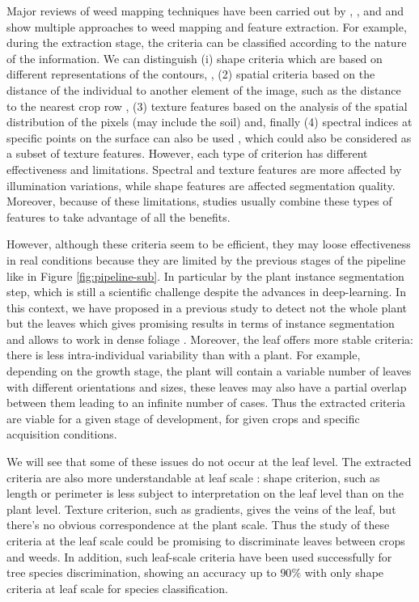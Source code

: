 \documentclass[../thesis.tex]{subfiles}
\begin{document}
	Major reviews of weed mapping techniques have been carried out by \cite{Monteiro2019}, \cite{GAO201843}, \cite{mostajer2019plant} and \cite{WANG2019226} and show multiple approaches to weed mapping and feature extraction. For example, during the extraction stage, the criteria can be classified according to the nature of the information. We can distinguish (i) shape criteria which are based on different representations of the contours, \cite{AHMED201298, PEREZ2000197}, (2) spatial criteria based on the distance of the individual to another element of the image, such as the distance to the nearest crop row \cite{rs10050761}, (3) texture features based on the analysis of the spatial distribution of the pixels (may include the soil) \cite{Rojas2017} and, finally (4) spectral indices at specific points on the surface can also be used \cite{Liu2019}, which could also be considered as a subset of texture features. However, each type of criterion has different effectiveness and limitations. Spectral and texture features are more affected by illumination variations, while shape features are affected segmentation quality. Moreover, because of these limitations, studies usually combine these types of features to take advantage of all the benefits.
    
    
    However, although these criteria seem to be efficient, they may loose effectiveness in real conditions because they are limited by the previous stages of the pipeline like in Figure \ref{fig:pipeline-sub}. In particular by the plant instance segmentation step, which is still a scientific challenge despite the advances in deep-learning. In this context, we have proposed in a previous study to detect not the whole plant but the leaves which gives promising results in terms of instance segmentation and allows to work in dense foliage \cite{vayssade2022}. Moreover, the leaf offers more stable criteria: there is less intra-individual variability than with a plant. For example, depending on the growth stage, the plant will contain a variable number of leaves with different orientations and sizes, these leaves may also have a partial overlap between them leading to an infinite number of cases. Thus the extracted criteria are viable for a given stage of development, for given crops and specific acquisition conditions.
    
    We will see that some of these issues do not occur at the leaf level. The extracted criteria are also more understandable at leaf scale : shape criterion, such as length or perimeter is less subject to interpretation on the leaf level than on the plant level. Texture criterion, such as gradients, gives the veins of the leaf, but there's no obvious correspondence at the plant scale. Thus the study of these criteria at the leaf scale could be promising to discriminate leaves between crops and weeds. In addition, such leaf-scale criteria have been used successfully for tree species discrimination, \cite{Cerutti2013, Cerutti2014} showing an accuracy up to $90\%$ with only shape criteria at leaf scale for species classification.
    
\end{document}
